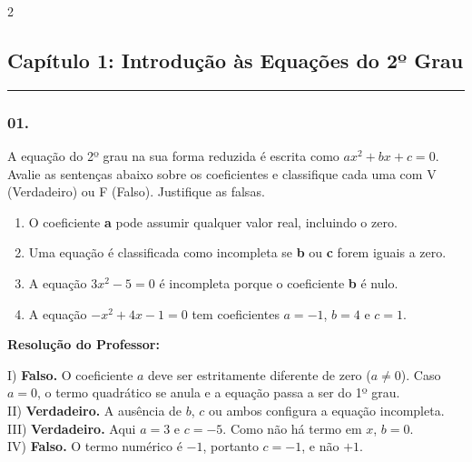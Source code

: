 \par\vspace{0.3cm} 
\raggedcolumns
\begin{multicols*}{2}
\vspace{0.1cm}


\subsection*{Capítulo 1: Introdução às Equações do 2º Grau}
\vspace{-0.2cm}\noindent\rule{\linewidth}{1.5pt} 
\par\vspace{\espacoPosTitulo}
\subsubsection*{01.} A equação do 2º grau na sua forma reduzida é escrita como $ ax^2 + bx + c = 0 $. Avalie as sentenças abaixo sobre os coeficientes e classifique cada uma com V (Verdadeiro) ou F (Falso). Justifique as falsas.
\begin{enumerate}[label=\Roman*., itemsep=\espacoAlt]
    \item O coeficiente \textbf{a} pode assumir qualquer valor real, incluindo o zero.
    \item Uma equação é classificada como incompleta se \textbf{b} ou \textbf{c} forem iguais a zero.
    \item A equação $ 3x^2 - 5 = 0 $ é incompleta porque o coeficiente \textbf{b} é nulo.
    \item A equação $ -x^2 + 4x - 1 = 0 $ tem coeficientes $ a = -1 $, $ b = 4 $ e $ c = 1 $.
\end{enumerate}

\ifgabarito
    \begin{tcolorbox}[colback=CorTitUm!5, colframe=CorTitUm, boxrule=1pt, arc=4pt, left=6pt, right=6pt, top=6pt, bottom=6pt]
    \small\textbf{\textcolor{CorTitUm}{Resolução do Professor:}}\par\vspace{0.1cm}
    \color{CinzaEscuro}
    I) \textbf{Falso.} O coeficiente $a$ deve ser estritamente diferente de zero ($a \neq 0$). Caso $a=0$, o termo quadrático se anula e a equação passa a ser do 1º grau.\\
    II) \textbf{Verdadeiro.} A ausência de $b$, $c$ ou ambos configura a equação incompleta.\\
    III) \textbf{Verdadeiro.} Aqui $a=3$ e $c=-5$. Como não há termo em $x$, $b=0$.\\
    IV) \textbf{Falso.} O termo numérico é $-1$, portanto $c = -1$, e não $+1$.
    \end{tcolorbox}
\fi


\end{multicols*}

